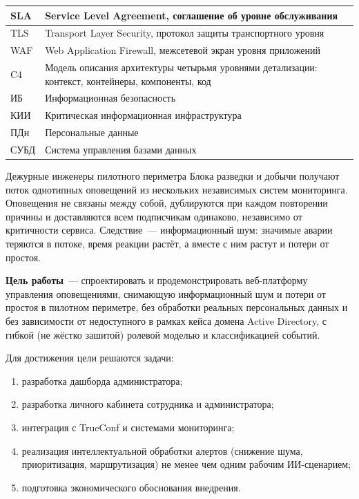 \documentclass[utf8x, 12pt]{G7-32} %
\begin{document}
\begin{longtable}{|p{2.6cm}|p{12.4cm}|}
SLA & Service Level Agreement, соглашение об уровне обслуживания \\ \hline
TLS & Transport Layer Security, протокол защиты транспортного уровня \\ \hline
WAF & Web Application Firewall, межсетевой экран уровня приложений \\ \hline
C4 & Модель описания архитектуры четырьмя уровнями детализации: контекст, контейнеры, компоненты, код \\ \hline
ИБ & Информационная безопасность \\ \hline
КИИ & Критическая информационная инфраструктура \\ \hline
ПДн & Персональные данные \\ \hline
СУБД & Система управления базами данных \\ \hline
\end{longtable}

\Introduction
Дежурные инженеры пилотного периметра Блока разведки и добычи получают поток
однотипных оповещений из нескольких независимых систем мониторинга.
Оповещения не связаны между собой, дублируются при каждом повторении причины и
доставляются всем подписчикам одинаково, независимо от критичности сервиса.
Следствие~--- информационный шум: значимые аварии теряются в потоке,
время реакции растёт, а вместе с ним растут и потери от простоя.

\textbf{Цель работы}~--- спроектировать и продемонстрировать веб-платформу
управления оповещениями, снимающую информационный шум и потери от простоя
в пилотном периметре, без обработки реальных персональных данных и без
зависимости от недоступного в рамках кейса домена Active Directory,
с гибкой (не жёстко зашитой) ролевой моделью и классификацией событий.

Для достижения цели решаются задачи:
\begin{enumerate}[1.]
    \item разработка дашборда администратора;
    \item разработка личного кабинета сотрудника и администратора;
    \item интеграция с TrueConf и системами мониторинга;
    \item реализация интеллектуальной обработки алертов (снижение шума,
          приоритизация, маршрутизация) не менее чем одним рабочим
          ИИ-сценарием;
    \item подготовка экономического обоснования внедрения.
\end{enumerate}
\end{document}
